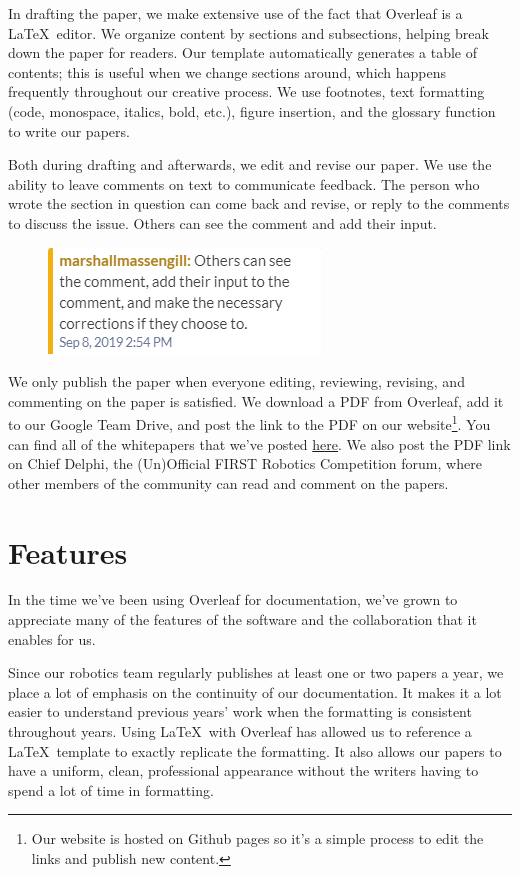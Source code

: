 \documentclass{zebracorns}
\begin{document}
In drafting the paper, we make extensive use of the fact that Overleaf is a \LaTeX\ editor. We organize content by sections and subsections, helping break down the paper for readers. Our template automatically generates a table of contents; this is useful when we change sections around, which happens frequently throughout our creative process. We use footnotes, text formatting (code, monospace, italics, bold, etc.), figure insertion, and the glossary function to write our papers.

Both during drafting and afterwards, we edit and revise our paper. We use the ability to leave comments on text to communicate feedback. The person who wrote the section in question can come back and revise, or reply to the comments to discuss the issue. Others can see the comment and add their input.

\begin{figure}[h]
  		\centering
  		\includegraphics{Comment.PNG}
\end{figure}

We only publish the paper when everyone editing, reviewing, revising, and commenting on the paper is satisfied. We download a PDF from Overleaf, add it to our Google Team Drive, and post the link to the PDF on our website\footnote{Our website is hosted on Github pages so it's a simple process to edit the links and publish new content.}. You can find all of the whitepapers that we've posted \href{team900.org/labs}{here}. We also post the PDF link on Chief Delphi, the (Un)Official FIRST Robotics Competition forum, where other members of the community can read and comment on the papers.

\section{Features}
In the time we've been using Overleaf for documentation, we've grown to appreciate many of the features of the software and the collaboration that it enables for us. 

Since our robotics team regularly publishes at least one or two papers a year, we place a lot of emphasis on the continuity of our documentation. It makes it a lot easier to understand previous years' work when the formatting is consistent throughout years. Using \LaTeX\ with Overleaf has allowed us to reference a \LaTeX\ template to exactly replicate the formatting. It also allows our papers to have a uniform, clean, professional appearance without the writers having to spend a lot of time in formatting. 
\end{document}

